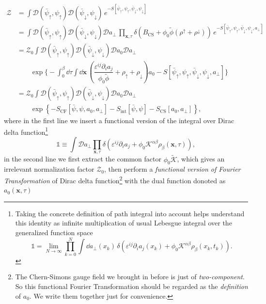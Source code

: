 \documentclass[bachelor,english,numbers]{ustcthesis}
\begin{document}
		\begin{align}
			\mathcal{Z}&=\int \mathcal{D}(\bar{\psi}_\uparrow,\psi_\uparrow)\mathcal{D}(\bar{\psi}_\downarrow,\psi_\downarrow)\,e^{-S[\bar{\psi}_\uparrow,\psi_\uparrow,\bar{\psi}_\downarrow,\psi_\downarrow]}\nonumber\\
			&=\int\mathcal{D}(\bar{\psi}_\uparrow,\psi_\uparrow)\mathcal{D}(\bar{\psi}_\downarrow,\psi_\downarrow)\mathcal{D}a_{\perp}\,\prod_{\bm{x},\tau}\delta\left(B_{\text{CS}}+\phi_0\widetilde{\phi}(\rho^\uparrow+\rho^\downarrow)\right)\,e^{-S[\bar{\psi}_\uparrow,\psi_\uparrow,\bar{\psi}_\downarrow,\psi_\downarrow,a_\perp]}\nonumber\\
			&=\mathcal{Z}_0\int\mathcal{D}(\bar{\psi}_\uparrow,\psi_\uparrow)\mathcal{D}(\bar{\psi}_\downarrow,\psi_\downarrow)\mathcal{D}a_0\mathcal{D}a_{\perp}\nonumber\\
			&\qquad\exp \bigg\{-\int_0^\beta\dd\tau\int\dd\bm{x}\,\left(\dfrac{\varepsilon^{ij}\partial_i a_j}{\phi_0\widetilde{\phi}}+\rho_\uparrow+\rho_\downarrow\right)a_0-S[\bar{\psi}_\uparrow,\psi_\uparrow,\bar{\psi}_\downarrow,\psi_\downarrow,a_\perp]\bigg\}\nonumber\\
			&=\mathcal{Z}_0\int\mathcal{D}(\bar{\psi}_\uparrow,\psi_\uparrow)\mathcal{D}(\bar{\psi}_\downarrow,\psi_\downarrow)\mathcal{D}a_0\mathcal{D}a_{\perp}\nonumber\\
			&\qquad\exp \left\{-S_{\text{CF}}[\bar{\psi},\psi,a_0,a_{\perp}]-S_{\text{int}}[\bar{\psi},\psi]-S_{\text{CS}}[a_0,a_{\perp}]\right\},\label{2.3.1}
		\end{align}
		where in the first line we insert a functional version of the integral over Dirac delta function\footnote{Taking the concrete definition of path integral into account helps understand this identity as infinite multiplication of usual Lebesgue integral over the generalized function space
		\begin{equation*}
			\mathds{1}=\lim_{N\rightarrow \infty}\prod_{k=0}^N\int\dd a_{\perp}(x_k)\,\delta(\varepsilon^{ij} \partial_i a_j(x_k)+\phi_0 \mathcal{K}^{\alpha \beta}\rho_{\beta}(x_k,t_k) ).
		\end{equation*}}
		\begin{equation*}
			\mathds{1}\equiv\int\mathcal{D}a_{\perp}\prod_{\bm{x},\tau}\delta(\varepsilon^{ij}\partial_i a_j+\phi_0\mathcal{K}^{\alpha \beta}\rho_\beta(\bm{x},\tau)),
		\end{equation*}
		in the second line we first extract the common factor $\phi_0\widetilde{\mathcal{K}}$, which gives an irrelevant normalization factor $\mathcal{Z}_0$, then perform a \emph{functional version of Fourier Transformation} of Dirac delta function\footnote{The Chern-Simons gauge field we brought in before is just of \emph{two-component}. So this functional Fourier Transformation should be regarded as the \emph{definition} of $a_0$. We write them together just for convenience.} with the dual function donoted as $a_0(\bm{x},\tau)$
\end{document}

